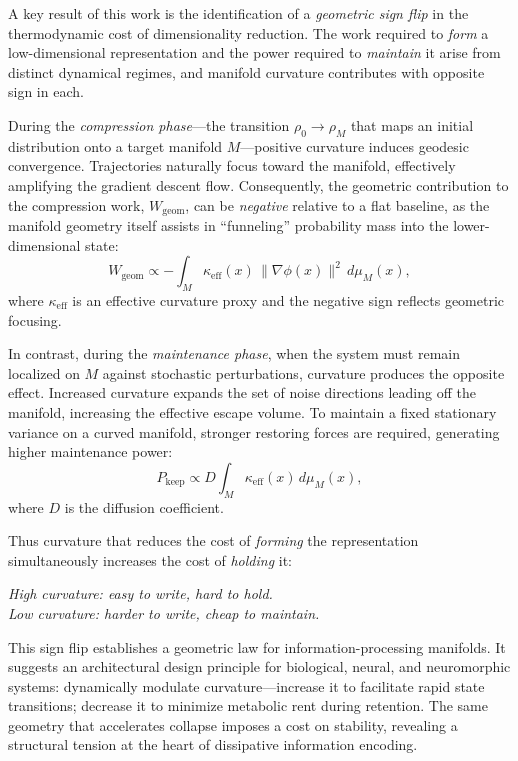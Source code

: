 \documentclass[aps,prx,twocolumn,superscriptaddress,floatfix]{revtex4-2}
\begin{document}
A key result of this work is the identification of a \emph{geometric sign flip} in the thermodynamic cost of dimensionality reduction. The work required to \emph{form} a low-dimensional representation and the power required to \emph{maintain} it arise from distinct dynamical regimes, and manifold curvature contributes with opposite sign in each.

During the \emph{compression phase}---the transition $\rho_0 \rightarrow \rho_M$ that maps an initial distribution onto a target manifold $M$---positive curvature induces geodesic convergence. Trajectories naturally focus toward the manifold, effectively amplifying the gradient descent flow. Consequently, the geometric contribution to the compression work, $W_{\mathrm{geom}}$, can be \emph{negative} relative to a flat baseline, as the manifold geometry itself assists in ``funneling'' probability mass into the lower-dimensional state:
\begin{equation}
W_{\mathrm{geom}} \propto -\int_M \kappa_{\mathrm{eff}}(x)\,\|\nabla\phi(x)\|^2\,d\mu_M(x),
\end{equation}
where $\kappa_{\mathrm{eff}}$ is an effective curvature proxy and the negative sign reflects geometric focusing.

In contrast, during the \emph{maintenance phase}, when the system must remain localized on $M$ against stochastic perturbations, curvature produces the opposite effect. Increased curvature expands the set of noise directions leading off the manifold, increasing the effective escape volume. To maintain a fixed stationary variance on a curved manifold, stronger restoring forces are required, generating higher maintenance power:
\begin{equation}
P_{\mathrm{keep}} \propto D\int_M \kappa_{\mathrm{eff}}(x)\, d\mu_M(x),
\end{equation}
where $D$ is the diffusion coefficient.

Thus curvature that reduces the cost of \emph{forming} the representation simultaneously increases the cost of \emph{holding} it:
\begin{center}
\emph{High curvature: easy to write, hard to hold.}\\
\emph{Low curvature: harder to write, cheap to maintain.}
\end{center}

This sign flip establishes a geometric law for information-processing manifolds. It suggests an architectural design principle for biological, neural, and neuromorphic systems: dynamically modulate curvature---increase it to facilitate rapid state transitions; decrease it to minimize metabolic rent during retention. The same geometry that accelerates collapse imposes a cost on stability, revealing a structural tension at the heart of dissipative information encoding.
\end{document}
